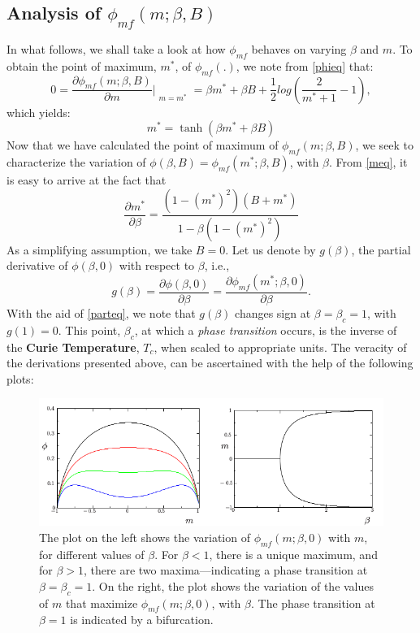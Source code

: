 \documentclass[letterpaper,english,10pt]{article}
\begin{document}
\subsection{Analysis of $\phi_{mf}(m;\beta,B)$}
In what follows, we shall take a look at how $\phi_{mf}$ behaves on varying $\beta$ and $m$.
To obtain the point of maximum, $m^{*}$, of $\phi_{mf}(.)$, we note from \eqref{phieq} that:
\begin{equation*}
    0 = \frac{\partial \phi_{mf}(m;\beta,B)}{\partial m}\Bigr|_{\substack{m=m^{*}}} = \beta m^{*} +\beta B + \frac{1}{2}log\left(\frac{2}{m^{*}+1}-1\right),
\end{equation*}
which yields:
\begin{equation}\label{meq}
    m^{*} = \tanh(\beta m^{*} + \beta B)
\end{equation}
Now that we have calculated the point of maximum of $\phi_{mf}(m;\beta,B)$, we seek to characterize the variation of $\phi(\beta,B)=\phi_{mf}(m^{*};\beta,B)$, with $\beta$.
From \eqref{meq}, it is easy to arrive at the fact that
\begin{equation}\label{parteq}
    \frac{\partial m^{*}}{\partial \beta} = \frac{(1-(m^{*})^{2})(B+m^{*})}{1-\beta(1-(m^{*})^{2})}
\end{equation}
As a simplifying assumption, we take $B=0$. Let us denote by $g(\beta)$, the partial derivative of $\phi(\beta,0)$ with respect to $\beta$, i.e.,
\begin{equation*}
    g(\beta) = \frac{\partial \phi(\beta,0)}{\partial \beta} = \frac{\partial \phi_{mf}(m^{*};\beta,0)}{\partial \beta}. 
\end{equation*}
With the aid of \eqref{parteq}, we note that $g(\beta)$ changes sign at $\beta = \beta_c=1$, with $g(1)=0$.
This point, $\beta_c$, at which a \textit{phase transition} occurs, is the inverse of the \textbf{Curie Temperature}, $T_c$, when scaled to appropriate units.
The veracity of the derivations presented above, can be ascertained with the help of the following plots:
\begin{figure}[h]
\centering
\includegraphics[width=\textwidth]{PhiPlots.png}
\caption{The plot on the left shows the variation of $\phi_{mf}(m;\beta,0)$ with $m$, for different values of $\beta$. For $\beta<1$, there is a unique maximum, and for $\beta>1$, there are two maxima---indicating a phase transition at $\beta=\beta_c=1$. On the right, the plot shows the variation of the values of $m$ that maximize $\phi_{mf}(m;\beta,0)$, with $\beta$. The phase transition at $\beta=1$ is indicated by a bifurcation.}
\end{figure}
\end{document}
